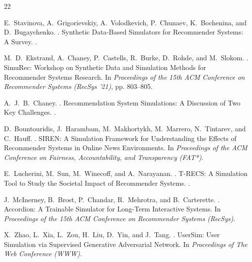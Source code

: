 \documentclass[sigconf,nonacm]{acmart}
\begin{document}
\begin{acks}
\end{acks}

\begin{thebibliography}{22}

E.~Stavinova, A.~Grigorievskiy, A.~Volodkevich, P.~Chunaev, K.~Bochenina, and D.~Bugaychenko.
.
\newblock Synthetic Data-Based Simulators for Recommender Systems: A Survey.
.

M.~D.~Ekstrand, A.~Chaney, P.~Castells, R.~Burke, D.~Rohde, and M.~Slokom.
.
\newblock SimuRec: Workshop on Synthetic Data and Simulation Methods for Recommender Systems Research.
\newblock In {\em Proceedings of the 15th ACM Conference on Recommender Systems (RecSys '21)}, pp. 803--805.

A.~J.~B.~Chaney.
.
\newblock Recommendation System Simulations: A Discussion of Two Key Challenges.
.

D.~Bountouridis, J.~Harambam, M.~Makhortykh, M.~Marrero, N.~Tintarev, and C.~Hauff.
.
\newblock SIREN: A Simulation Framework for Understanding the Effects of Recommender Systems in Online News Environments.
\newblock In {\em Proceedings of the ACM Conference on Fairness, Accountability, and Transparency (FAT*)}.

E.~Lucherini, M.~Sun, M.~Winecoff, and A.~Narayanan.
.
\newblock T-RECS: A Simulation Tool to Study the Societal Impact of Recommender Systems.
.

J.~McInerney, B.~Brost, P.~Chandar, R.~Mehrotra, and B.~Carterette.
.
\newblock Accordion: A Trainable Simulator for Long-Term Interactive Systems.
\newblock In {\em Proceedings of the 15th ACM Conference on Recommender Systems (RecSys)}.

X.~Zhao, L.~Xia, L.~Zou, H.~Liu, D.~Yin, and J.~Tang.
.
\newblock UserSim: User Simulation via Supervised Generative Adversarial Network.
\newblock In {\em Proceedings of The Web Conference (WWW)}.


\end{thebibliography}
\end{document}
